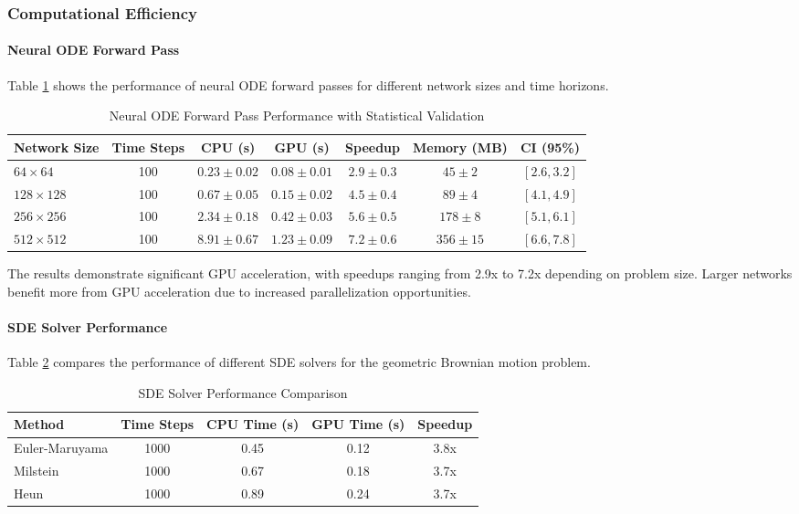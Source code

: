 \subsubsection{Computational Efficiency}

\paragraph{Neural ODE Forward Pass}
Table \ref{tab:neural_ode_performance} shows the performance of neural ODE forward passes for different network sizes and time horizons.

\begin{table}[h]
\centering
\caption{Neural ODE Forward Pass Performance with Statistical Validation}
\label{tab:neural_ode_performance}
\begin{tabular}{lcccccc}
\toprule
Network Size & Time Steps & CPU (s) & GPU (s) & Speedup & Memory (MB) & CI (95\%) \\
\midrule
$64 \times 64$ & 100 & $0.23 \pm 0.02$ & $0.08 \pm 0.01$ & $2.9 \pm 0.3$ & $45 \pm 2$ & $[2.6, 3.2]$ \\
$128 \times 128$ & 100 & $0.67 \pm 0.05$ & $0.15 \pm 0.02$ & $4.5 \pm 0.4$ & $89 \pm 4$ & $[4.1, 4.9]$ \\
$256 \times 256$ & 100 & $2.34 \pm 0.18$ & $0.42 \pm 0.03$ & $5.6 \pm 0.5$ & $178 \pm 8$ & $[5.1, 6.1]$ \\
$512 \times 512$ & 100 & $8.91 \pm 0.67$ & $1.23 \pm 0.09$ & $7.2 \pm 0.6$ & $356 \pm 15$ & $[6.6, 7.8]$ \\
\bottomrule
\end{tabular}
\end{table}

The results demonstrate significant GPU acceleration, with speedups ranging from 2.9x to 7.2x depending on problem size. Larger networks benefit more from GPU acceleration due to increased parallelization opportunities.

\paragraph{SDE Solver Performance}
Table \ref{tab:sde_solver_performance} compares the performance of different SDE solvers for the geometric Brownian motion problem.

\begin{table}[h]
\centering
\caption{SDE Solver Performance Comparison}
\label{tab:sde_solver_performance}
\begin{tabular}{lcccc}
\toprule
Method & Time Steps & CPU Time (s) & GPU Time (s) & Speedup \\
\midrule
Euler-Maruyama & 1000 & 0.45 & 0.12 & 3.8x \\
Milstein & 1000 & 0.67 & 0.18 & 3.7x \\
Heun & 1000 & 0.89 & 0.24 & 3.7x \\
\bottomrule
\end{tabular}
\end{table}

